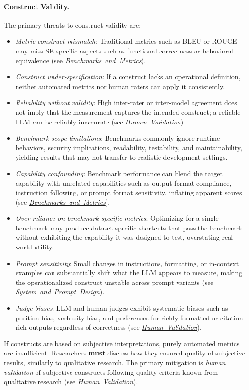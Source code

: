 \documentclass[smallextended]{svjour3}
\newcommand{\must}{\textbf{must}\xspace}
\newcommand{\design}{\hyperref[sec:report-system-and-prompt-design]{\mbox{\emph{System and Prompt Design}}}\xspace}
\newcommand{\benchmarksmetrics}{\hyperref[sec:use-suitable-baselines-benchmarks-and-metrics]{\mbox{\emph{Benchmarks and Metrics}}}\xspace}
\newcommand{\humanvalidation}{\hyperref[sec:use-human-validation-for-llm-outputs]{\mbox{\emph{Human Validation}}}\xspace}
\newcommand{\design}{\href{/guidelines/design/}{\emph{System and Prompt Design}}\xspace}
\newcommand{\benchmarksmetrics}{\href{/guidelines/benchmarks-metrics/}{\emph{Benchmarks and Metrics}}\xspace}
\newcommand{\humanvalidation}{\href{/guidelines/human-validation/}{\emph{Human Validation}}\xspace}
\newcommand{\guidelineparagraph}[1]{\paragraph{#1.}}
\newcommand{\guidelineparagraph}[1]{\paragraph{#1}}
\begin{document}
\guidelineparagraph{Construct Validity}
The primary threats to construct validity are:
\begin{itemize}
	\item \emph{Metric-construct mismatch}: Traditional metrics such as BLEU or ROUGE may miss SE-specific aspects such as functional correctness or behavioral equivalence (see \benchmarksmetrics).
	\item \emph{Construct under-specification}: If a construct lacks an operational definition, neither automated metrics nor human raters can apply it consistently.
	\item \emph{Reliability without validity}: High inter-rater or inter-model agreement does not imply that the measurement captures the intended construct; a reliable LLM can be reliably inaccurate (see \humanvalidation).
	\item \emph{Benchmark scope limitations}: Benchmarks commonly ignore runtime behaviors, security implications, readability, testability, and maintainability, yielding results that may not transfer to realistic development settings.
	\item \emph{Capability confounding}: Benchmark performance can blend the target capability with unrelated capabilities such as output format compliance, instruction following, or prompt format sensitivity, inflating apparent scores (see \benchmarksmetrics).
	\item \emph{Over-reliance on benchmark-specific metrics}: Optimizing for a single benchmark may produce dataset-specific shortcuts that pass the benchmark without exhibiting the capability it was designed to test, overstating real-world utility.
	\item \emph{Prompt sensitivity}: Small changes in instructions, formatting, or in-context examples can substantially shift what the LLM appears to measure, making the operationalized construct unstable across prompt variants (see \design).
	\item \emph{Judge biases}: LLM and human judges exhibit systematic biases such as position bias, verbosity bias, and preferences for richly formatted or citation-rich outputs regardless of correctness (see \humanvalidation).
\end{itemize}

If constructs are based on subjective interpretations, purely automated metrics are insufficient. Researchers \must discuss how they ensured quality of subjective results, similarly to qualitative research. The primary mitigation is \emph{human validation} of subjective constructs following quality criteria known from qualitative research (see \humanvalidation).
\end{document}
